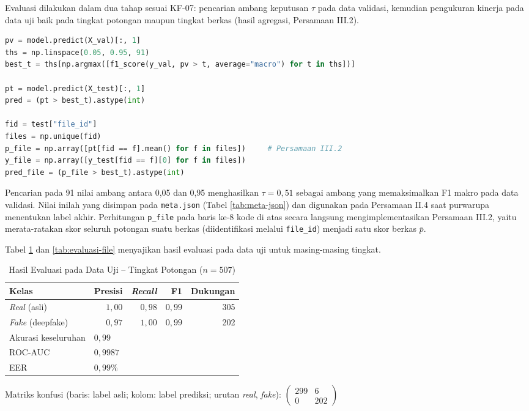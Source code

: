 Evaluasi dilakukan dalam dua tahap sesuai KF-07: pencarian ambang keputusan $\tau$
pada data validasi, kemudian pengukuran kinerja pada data uji baik pada tingkat
potongan maupun tingkat berkas (hasil agregasi, Persamaan III.2).

\begin{lstlisting}[language=Python, caption={Pencarian ambang keputusan dan evaluasi model}, label={lst:evaluasi}]
pv = model.predict(X_val)[:, 1]
ths = np.linspace(0.05, 0.95, 91)
best_t = ths[np.argmax([f1_score(y_val, pv > t, average="macro") for t in ths])]

pt = model.predict(X_test)[:, 1]
pred = (pt > best_t).astype(int)

fid = test["file_id"]
files = np.unique(fid)
p_file = np.array([pt[fid == f].mean() for f in files])     # Persamaan III.2
y_file = np.array([y_test[fid == f][0] for f in files])
pred_file = (p_file > best_t).astype(int)
\end{lstlisting}

Pencarian pada 91 nilai ambang antara 0,05 dan 0,95 menghasilkan $\tau=0{,}51$
sebagai ambang yang memaksimalkan F1 makro pada data validasi. Nilai inilah yang
disimpan pada \texttt{meta.json} (Tabel \ref{tab:meta-json}) dan digunakan pada
Persamaan II.4 saat purwarupa menentukan label akhir. Perhitungan \texttt{p\_file}
pada baris ke-8 kode di atas secara langsung mengimplementasikan Persamaan III.2,
yaitu merata-ratakan skor seluruh potongan suatu berkas (diidentifikasi melalui
\texttt{file\_id}) menjadi satu skor berkas $\bar{p}$.

Tabel \ref{tab:evaluasi-chunk} dan \ref{tab:evaluasi-file} menyajikan hasil evaluasi
pada data uji untuk masing-masing tingkat.

\begin{table}[htbp]
  \centering
  \caption{Hasil Evaluasi pada Data Uji -- Tingkat Potongan ($n=507$)}
  \label{tab:evaluasi-chunk}
  \begin{tabular}{@{}lrrrr@{}}
    \toprule
    \textbf{Kelas} & \textbf{Presisi} & \textbf{\textit{Recall}} & \textbf{F1} & \textbf{Dukungan} \\
    \midrule
    \textit{Real} (asli) & $1{,}00$ & $0{,}98$ & $0{,}99$ & 305 \\
    \textit{Fake} (deepfake) & $0{,}97$ & $1{,}00$ & $0{,}99$ & 202 \\
    \midrule
    Akurasi keseluruhan & \multicolumn{4}{l}{$0{,}99$} \\
    ROC-AUC & \multicolumn{4}{l}{$0{,}9987$} \\
    EER & \multicolumn{4}{l}{$0{,}99\%$} \\
    \bottomrule
  \end{tabular}

  \vspace{2mm}
  \small Matriks konfusi (baris: label asli; kolom: label prediksi; urutan \textit{real}, \textit{fake}):
  $\begin{pmatrix} 299 & 6 \\ 0 & 202 \end{pmatrix}$
\end{table}

